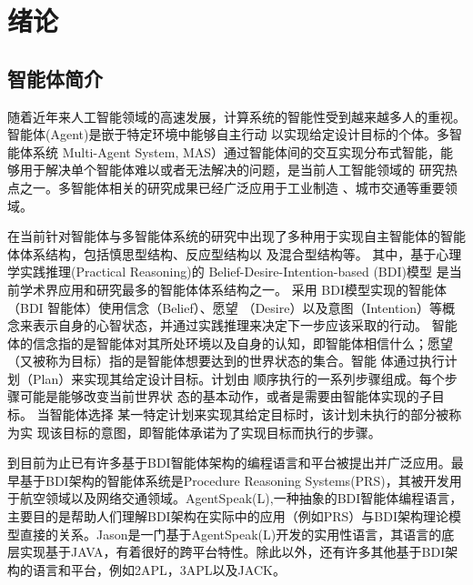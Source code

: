 \chapter{绪论}
\section{智能体简介}
随着近年来人工智能领域的高速发展，计算系统的智能性受到越来越多人的重视。智能体(Agent)是嵌于特定环境中能够自主行动 以实现给定设计目标的个体\cite{DBLP:books/daglib/0023784}。多智能体系统 Multi-Agent System, MAS）\cite{DBLP:books/daglib/0023784}通过智能体间的交互实现分布式智能，能够用于解决单个智能体难以或者无法解决的问题，是当前人工智能领域的 研究热点之一。多智能体相关的研究成果已经广泛应用于工业制造\cite{biernatzki2004agent} 、城市交通等重要领域\cite{DBLP:journals/tits/ChenC10}。

在当前针对智能体与多智能体系统的研究中出现了多种用于实现自主智能体的智能体体系结构，包括慎思型结构、反应型结构以 及混合型结构\cite{DBLP:conf/atal/2000, DBLP:journals/ker/WooldridgeJ95}等。
其中，基于心理学实践推理(Practical Reasoning)\cite{bratman1987intention}的 Belief-Desire-Intention-based (BDI)模型\cite{DBLP:conf/atal/GeorgeffPPTW98} 是当前学术界应用和研究最多的智能体体系结构之一。
%
采用 BDI模型实现的智能体（BDI 智能体）使用信念（Belief）、愿望 （Desire）以及意图（Intention）等概念来表示自身的心智状态，并通过实践推理来决定下一步应该采取的行动。
%
智能体的信念指的是智能体对其所处环境以及自身的认知，即智能体相信什么；愿望（又被称为目标）指的是智能体想要达到的世界状态的集合。智能 体通过执行计划（Plan）来实现其给定设计目标。计划由 顺序执行的一系列步骤组成。每个步骤可能是能够改变当前世界状 态的基本动作，或者是需要由智能体实现的子目标。
%
当智能体选择 某一特定计划来实现其给定目标时，该计划未执行的部分被称为实 现该目标的意图，即智能体承诺为了实现目标而执行的步骤。

到目前为止已有许多基于BDI智能体架构的编程语言和平台被提出并广泛应用。最早基于BDI架构的智能体系统是Procedure Reasoning Systems(PRS)，其被开发用于航空领域\cite{DBLP:conf/aaai/GeorgeffL87}以及网络交通领域\cite{DBLP:conf/aaaiss/Wobcke07}。AgentSpeak(L)\cite{DBLP:conf/maamaw/Rao96},一种抽象的BDI智能体编程语言，主要目的是帮助人们理解BDI架构在实际中的应用（例如PRS）与BDI架构理论模型直接的关系。Jason\cite{bordini2007programming}是一门基于AgentSpeak(L)开发的实用性语言，其语言的底层实现基于JAVA，有着很好的跨平台特性。除此以外，还有许多其他基于BDI架构的语言和平台，例如2APL\cite{DBLP:journals/aamas/Dastani08}，3APL\cite{DBLP:books/sp/map2005/DastaniRM05}以及JACK\cite{DBLP:books/sp/map2005/Winikoff05}。

